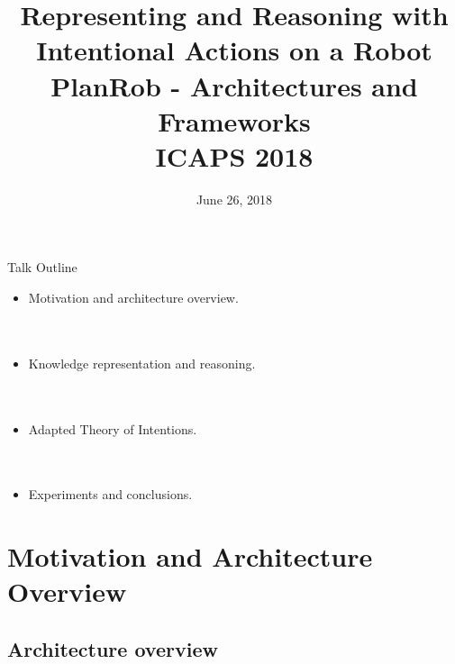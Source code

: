 \documentclass[xcolor=dvipsnames]{beamer}
\title{Representing and Reasoning with Intentional Actions on a Robot\\
  \small{PlanRob - Architectures and Frameworks\\ICAPS 2018}} \author[Rocio Gomez] %
\institute[The University of Auckland] %
{
  Department of Electrical and Computer Engineering\\
  The University of Auckland, NZ 
}
\institute[University of Birmingham]
{
  School of Computer Science\\
  University of Birmingham, UK 
}
\date[June 2017] %
{\small{June 26, 2018}}
\begin{document}
\begin{frame}
    \titlepage
\end{frame}


\begin{frame}{Talk Outline}
  \begin{itemize}
  \item  Motivation and architecture overview.
    \ \\
    \ \\
    \ \\
  \item Knowledge representation and reasoning.
    \ \\
    \ \\
    \ \\
  \item Adapted Theory of Intentions.
    \ \\
    \ \\
    \ \\
  \item Experiments and conclusions.
  \end{itemize}
\end{frame}





\section{Motivation and Architecture Overview}

\subsection{Architecture overview}
\end{document}
